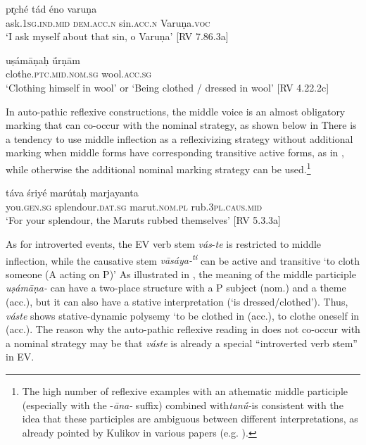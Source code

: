 \documentclass[output=paper]{langscibook}
\begin{document}
\ea\label{ex:Orqueda:11}
 \ea
  \label{ex:Orqueda:11a}
 \gll pr̥ché  tád  éno  varuṇa\\
      ask.\textsc{1sg.ind.mid}  \textsc{dem.acc.n}  sin.\textsc{acc.n}  Varuṇa.\textsc{voc}\\
\glt ‘I ask myself about that sin, o Varuṇa’ [RV 7.86.3a]

\ex
 \label{ex:Orqueda:11b}
\gll uṣámāṇaḥ  \'{ū}rṇām\\
      clothe.\textsc{ptc.mid.nom.sg}  wool.\textsc{acc.sg}\\
\glt ‘Clothing himself in wool’ or ‘Being clothed / dressed in wool’ [RV 4.22.2c]
\z
\z

{In auto-pathic reflexive constructions, the middle voice is an almost obligatory marking that can co-occur with the nominal strategy, as shown below in  There is a tendency to use middle inflection as a reflexivizing strategy without additional marking when middle forms have corresponding transitive active forms, as in , while otherwise the additional nominal marking strategy can be used.}\footnote{{{The high number of reflexive examples with an athematic middle participle (especially with the -}{\textit{āna-} }{suffix) combined with}{\textit{tan\'{ū}-}}{is consistent with the idea that these participles are ambiguous between different interpretations, as already pointed by Kulikov in various papers (e.g. \citealt{Kulikov2006}).}}}

 \ea\label{ex:Orqueda:12}
 \gll táva   śriyé   marútaḥ   marjayanta\\
   you.\textsc{gen.sg}   splendour.\textsc{dat.sg}   marut.\textsc{nom.pl}   rub.\textsc{3pl.caus.mid}\\
\glt ‘For your splendour, the Maruts rubbed themselves’ [RV 5.3.3a]
\z

{As for introverted events, the EV verb stem \textit{vás}{}-\textit{te} is restricted to middle inflection, while the causative stem \textit{vāsáya-\textsuperscript{ti}} can be active and transitive ‘to cloth someone (A acting on P)’ As illustrated in , the meaning of the middle participle \textit{uṣámāṇa-} can have a two-place structure with a P subject (nom.) and a theme (acc.), but it can also have a stative interpretation (‘is dressed/clothed’). Thus, \textit{váste} shows stative-dynamic polysemy ‘to be clothed in (acc.), to clothe oneself in (acc.). The reason why the auto-pathic reflexive reading in  does not co-occur with a nominal strategy may be that \textit{váste} is already a special “introverted verb stem” in EV.}
\end{document}
